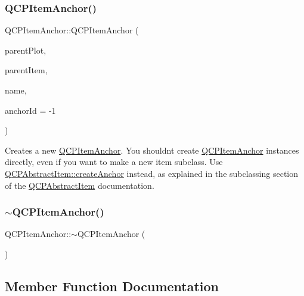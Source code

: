 \subsubsection{\texorpdfstring{QCPItemAnchor()}{QCPItemAnchor()}}
{\footnotesize\ttfamily Q\+C\+P\+Item\+Anchor\+::\+Q\+C\+P\+Item\+Anchor (\begin{DoxyParamCaption}\item[{\mbox{\hyperlink{class_q_custom_plot}{Q\+Custom\+Plot}} $\ast$}]{parent\+Plot,  }\item[{\mbox{\hyperlink{class_q_c_p_abstract_item}{Q\+C\+P\+Abstract\+Item}} $\ast$}]{parent\+Item,  }\item[{const Q\+String \&}]{name,  }\item[{int}]{anchor\+Id = {\ttfamily -\/1} }\end{DoxyParamCaption})}

Creates a new \mbox{\hyperlink{class_q_c_p_item_anchor}{Q\+C\+P\+Item\+Anchor}}. You shouldn\textquotesingle{}t create \mbox{\hyperlink{class_q_c_p_item_anchor}{Q\+C\+P\+Item\+Anchor}} instances directly, even if you want to make a new item subclass. Use \mbox{\hyperlink{class_q_c_p_abstract_item_af3fc92527802078ca395138748b629a7}{Q\+C\+P\+Abstract\+Item\+::create\+Anchor}} instead, as explained in the subclassing section of the \mbox{\hyperlink{class_q_c_p_abstract_item}{Q\+C\+P\+Abstract\+Item}} documentation. \mbox{\label{class_q_c_p_item_anchor_a1868559407600688ee4d1a4621e81ceb}} 
\subsubsection{\texorpdfstring{$\sim$QCPItemAnchor()}{~QCPItemAnchor()}}
{\footnotesize\ttfamily Q\+C\+P\+Item\+Anchor\+::$\sim$\+Q\+C\+P\+Item\+Anchor (\begin{DoxyParamCaption}{ }\end{DoxyParamCaption})\hspace{0.3cm}{\ttfamily [virtual]}}



\subsection{Member Function Documentation}
\mbox{\label{class_q_c_p_item_anchor_aef15daa640debfb11b0aeaa2116c6fbc}} 
